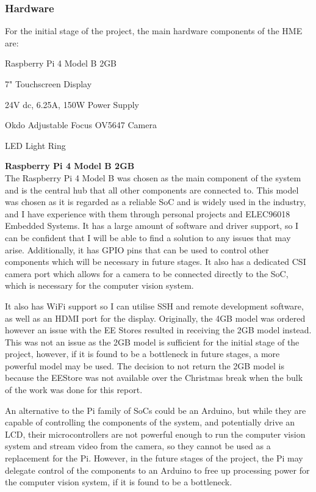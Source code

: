 \subsubsection{Hardware} \label{sec:hardware}
For the initial stage of the project, the main hardware components of the HME are:
\begin{mylist}
  \item Raspberry Pi 4 Model B 2GB\cite{pi4}
  \item 7" Touchscreen Display\cite{7inchdisplay}
  \item 24V dc, 6.25A, 150W Power Supply
  \item Okdo Adjustable Focus OV5647 Camera\cite{okdocamera}
  \item LED Light Ring
\end{mylist}
\textbf{Raspberry Pi 4 Model B 2GB} \\
The Raspberry Pi 4 Model B was chosen as the main component of the system and is the central hub that all other components are connected to.
This model was chosen as it is regarded as a reliable SoC and is widely used in the industry, and I have experience with
them through personal projects and ELEC96018 Embedded Systems. It has a large amount of software
and driver support, so I can be confident that I will be able to find a solution to any issues that may arise. Additionally, 
it has GPIO pins that can be used to control other components which will be necessary in future stages. It also has a 
dedicated CSI camera port which allows for a camera to be connected directly to the SoC, which is necessary for the computer vision system.

It also has WiFi support so I can utilise SSH and remote development software, as well as an HDMI port for the display.
Originally, the 4GB model was ordered however an issue with the EE Stores resulted in receiving the 2GB model instead.
This was not an issue as the 2GB model is sufficient for the initial stage of the project, however, if it is found to be a bottleneck
in future stages, a more powerful model may be used. The decision to not return the 2GB model is because the EEStore was not
available over the Christmas break when the bulk of the work was done for this report.

An alternative to the Pi family of SoCs could be an Arduino, but while they are capable of controlling the components of the system,
and potentially drive an LCD, their microcontrollers are not powerful enough to run the computer vision system and stream video from the camera,
so they cannot be used as a replacement for the Pi. However, in the future stages of the project, the Pi may delegate control of the components to an Arduino
to free up processing power for the computer vision system, if it is found to be a bottleneck.

